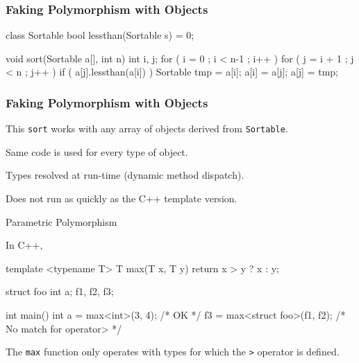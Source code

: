 \documentclass{plt}
\begin{document}
\begin{frame}[fragile]
  \frametitle{Faking Polymorphism with Objects}

\begin{cpp}
class Sortable {
  bool lessthan(Sortable s) = 0;
}

void sort(Sortable a[], int n) {
  int i, j;
  for ( i = 0 ; i < n-1 ; i++ )
    for ( j = i + 1 ; j < n ; j++ )
      if ( a[j].lessthan(a[i]) ) {
        Sortable tmp = a[i];
        a[i] = a[j];
        a[j] = tmp;
      }
}
\end{cpp}

\end{frame}



\begin{frame}[fragile]
  \frametitle{Faking Polymorphism with Objects}

This \verb|sort| works with any array of objects derived from
\verb|Sortable|.

Same code is used for every type of object.

Types resolved at run-time (dynamic method dispatch).

Does not run as quickly as the C++ template version.

\end{frame}

\begin{frame}[fragile]{Parametric Polymorphism}

In C++,

\begin{C++}
template <typename T>
T max(T x, T y)
{
  return x > y ? x : y;
}

struct foo {int a;} f1, f2, f3;

int main()
{
  int a = max<int>(3, 4); /* OK */
  f3 = max<struct foo>(f1, f2);  /* No match for operator> */
}
\end{C++}

The \texttt{max} function only operates with types for which the
\texttt{>} operator is defined.

\end{frame}
\end{document}
